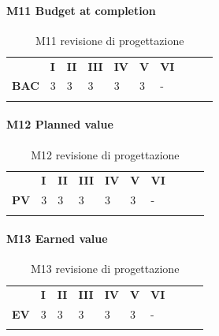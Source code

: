 \paragraph{M11 Budget at completion} \mbox{}
\begin{longtable}[H!] {						
		>{}p{50mm}  		
		>{}p{8mm}
		>{}p{8mm}		
		>{}p{8mm}		
		>{}p{8mm}		
		>{}p{8mm}		
		>{}p{8mm}
		>{}p{8mm}
		>{}p{8mm}
		>{}p{8mm}
	}
	\rowcolor{gray!50}
	\textbf{} & \textbf{I} & \textbf{II} & \textbf{III} & \textbf{IV} & \textbf{V} & \textbf{VI} \TBstrut \\ [2mm]
	\textbf{BAC} & 3 & 3 & 3 & 3 & 3 & - \TBstrut \\ [2mm]
	\rowcolor{white}
	\caption{M11 revisione di progettazione}
\end{longtable}
\paragraph{M12 Planned value} \mbox{}
\begin{longtable}[H!] {						
		>{}p{50mm}  		
		>{}p{8mm}
		>{}p{8mm}		
		>{}p{8mm}		
		>{}p{8mm}		
		>{}p{8mm}		
		>{}p{8mm}
		>{}p{8mm}
		>{}p{8mm}
		>{}p{8mm}
	}
	\rowcolor{gray!50}
	\textbf{} & \textbf{I} & \textbf{II} & \textbf{III} & \textbf{IV} & \textbf{V} & \textbf{VI} \TBstrut \\ [2mm]
	\textbf{PV} & 3 & 3 & 3 & 3 & 3 & - \TBstrut \\ [2mm]
	\rowcolor{white}
	\caption{M12 revisione di progettazione}
\end{longtable}
\paragraph{M13 Earned value} \mbox{}
\begin{longtable}[H!] {						
		>{}p{50mm}  		
		>{}p{8mm}
		>{}p{8mm}		
		>{}p{8mm}		
		>{}p{8mm}		
		>{}p{8mm}		
		>{}p{8mm}
		>{}p{8mm}
		>{}p{8mm}
		>{}p{8mm}
	}
	\rowcolor{gray!50}
	\textbf{} & \textbf{I} & \textbf{II} & \textbf{III} & \textbf{IV} & \textbf{V} & \textbf{VI} \TBstrut \\ [2mm]
	\textbf{EV} & 3 & 3 & 3 & 3 & 3 & - \TBstrut \\ [2mm]
	\rowcolor{white}
	\caption{M13 revisione di progettazione}
\end{longtable}
